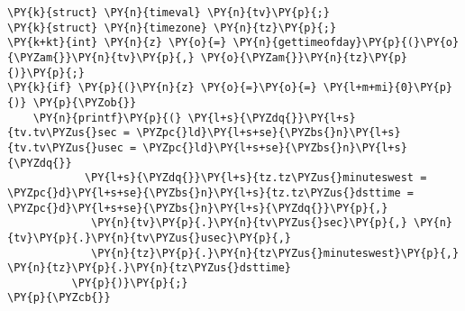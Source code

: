 \begin{Verbatim}[commandchars=\\\{\}]
\PY{k}{struct} \PY{n}{timeval} \PY{n}{tv}\PY{p}{;}
\PY{k}{struct} \PY{n}{timezone} \PY{n}{tz}\PY{p}{;}
\PY{k+kt}{int} \PY{n}{z} \PY{o}{=} \PY{n}{gettimeofday}\PY{p}{(}\PY{o}{\PYZam{}}\PY{n}{tv}\PY{p}{,} \PY{o}{\PYZam{}}\PY{n}{tz}\PY{p}{)}\PY{p}{;}
\PY{k}{if} \PY{p}{(}\PY{n}{z} \PY{o}{=}\PY{o}{=} \PY{l+m+mi}{0}\PY{p}{)} \PY{p}{\PYZob{}}
    \PY{n}{printf}\PY{p}{(} \PY{l+s}{\PYZdq{}}\PY{l+s}{tv.tv\PYZus{}sec = \PYZpc{}ld}\PY{l+s+se}{\PYZbs{}n}\PY{l+s}{tv.tv\PYZus{}usec = \PYZpc{}ld}\PY{l+s+se}{\PYZbs{}n}\PY{l+s}{\PYZdq{}}
            \PY{l+s}{\PYZdq{}}\PY{l+s}{tz.tz\PYZus{}minuteswest = \PYZpc{}d}\PY{l+s+se}{\PYZbs{}n}\PY{l+s}{tz.tz\PYZus{}dsttime = \PYZpc{}d}\PY{l+s+se}{\PYZbs{}n}\PY{l+s}{\PYZdq{}}\PY{p}{,}
             \PY{n}{tv}\PY{p}{.}\PY{n}{tv\PYZus{}sec}\PY{p}{,} \PY{n}{tv}\PY{p}{.}\PY{n}{tv\PYZus{}usec}\PY{p}{,}
             \PY{n}{tz}\PY{p}{.}\PY{n}{tz\PYZus{}minuteswest}\PY{p}{,} \PY{n}{tz}\PY{p}{.}\PY{n}{tz\PYZus{}dsttime}
          \PY{p}{)}\PY{p}{;}
\PY{p}{\PYZcb{}}
\end{Verbatim}
